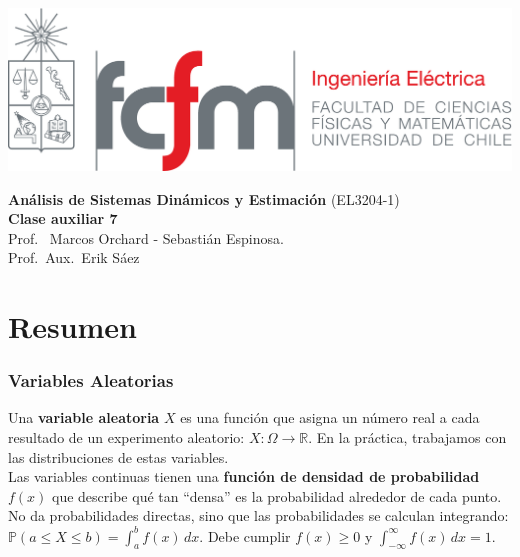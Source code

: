 \documentclass[
  11pt,
  letterpaper,
   addpoints,
  answers
  ]{exam}
\begin{document}
\pagestyle{plain}

\noindent
\begin{minipage}{0.47\textwidth}
\includegraphics[width=\textwidth]{../fcfm_die}
\end{minipage}
\begin{minipage}{0.53\textwidth}
\begin{center} 
\large\textbf{Análisis de Sistemas Dinámicos y Estimación} (EL3204-1) \\
\large\textbf{Clase auxiliar 7} \\
\normalsize Prof.~ Marcos Orchard - Sebastián Espinosa.\\
\normalsize Prof.~Aux.~Erik Sáez
\end{center}
\end{minipage}

\vspace{0.5cm}
\noindent
\vspace{.85cm}
\section{Resumen}

\subsubsection*{Variables Aleatorias}

Una \textbf{variable aleatoria} $X$ es una función que asigna un número real a cada resultado de un experimento aleatorio: $X : \Omega \longrightarrow \mathbb{R}$. En la práctica, trabajamos con las distribuciones de estas variables.\\

Las variables continuas tienen una \textbf{función de densidad de probabilidad} $f(x)$ que describe qué tan ``densa'' es la probabilidad alrededor de cada punto. No da probabilidades directas, sino que las probabilidades se calculan integrando: $\mathbb{P}(a \leq X \leq b) = \int_a^b f(x) \, dx$. Debe cumplir $f(x) \geq 0$ y $\int_{-\infty}^{\infty} f(x) \, dx = 1$.\\
\end{document}
